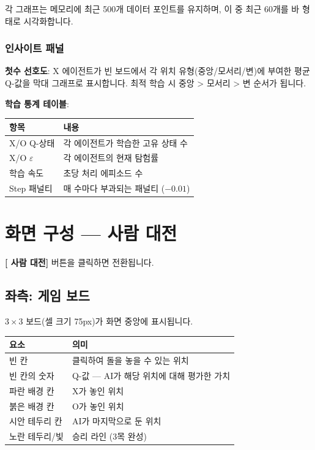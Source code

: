 \documentclass[11pt,a4paper]{article}
\begin{document}
각 그래프는 메모리에 최근 500개 데이터 포인트를 유지하며, 이 중 최근 60개를 바 형태로 시각화합니다.

\subsubsection{인사이트 패널}

\textbf{첫수 선호도}: X 에이전트가 빈 보드에서 각 위치 유형(중앙/모서리/변)에 부여한 평균 Q-값을 막대 그래프로 표시합니다. 최적 학습 시  중앙 >  모서리 >  변 순서가 됩니다.

\textbf{학습 통계 테이블}:

\begin{center}
\renewcommand{\arraystretch}{1.4}
\begin{tabular}{|l|p{8cm}|}
\hline
\rowcolor{tableheader}
\textbf{항목} & \textbf{내용} \\
\hline
X/O Q-상태 & 각 에이전트가 학습한 고유 상태 수 \\
\hline
X/O \(\varepsilon\) & 각 에이전트의 현재 탐험률 \\
\hline
학습 속도 & 초당 처리 에피소드 수 \\
\hline
Step 패널티 & 매 수마다 부과되는 패널티 (\(-0.01\)) \\
\hline
\end{tabular}
\end{center}

\section{화면 구성 — 사람 대전}

\textbf{[ 사람 대전]} 버튼을 클릭하면 전환됩니다.

\subsection{좌측: 게임 보드}

\(3 \times 3\) 보드(셀 크기 75px)가 화면 중앙에 표시됩니다.

\begin{center}
\renewcommand{\arraystretch}{1.4}
\begin{tabular}{|l|p{8cm}|}
\hline
\rowcolor{tableheader}
\textbf{요소} & \textbf{의미} \\
\hline
빈 칸 & 클릭하여 돌을 놓을 수 있는 위치 \\
\hline
빈 칸의 숫자 & Q-값 — AI가 해당 위치에 대해 평가한 가치 \\
\hline
파란 배경 칸 & X가 놓인 위치 \\
\hline
붉은 배경 칸 & O가 놓인 위치 \\
\hline
시안 테두리 칸 & AI가 마지막으로 둔 위치 \\
\hline
노란 테두리/빛 & 승리 라인 (3목 완성) \\
\hline
\end{tabular}
\end{center}
\end{document}
